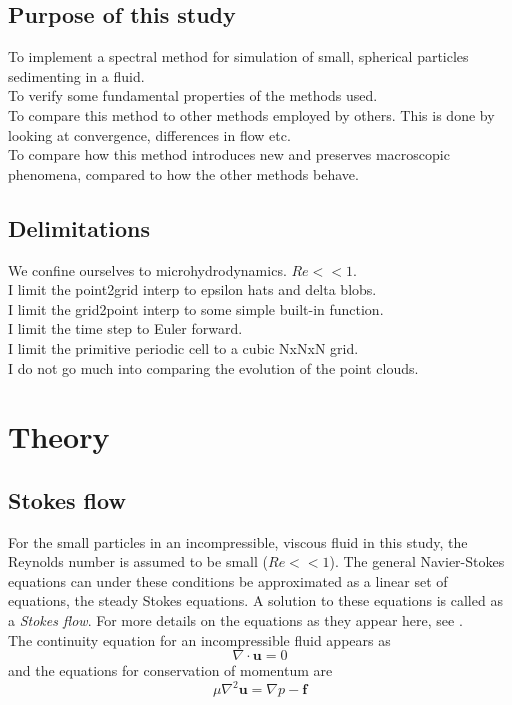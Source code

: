\documentclass[a4paper,twoside=false,abstract=false,numbers=noenddot,
titlepage=false,headings=small,parskip=half,version=last]{scrartcl}
\begin{document}
\subsection{Purpose of this study}
To implement a spectral method for simulation of small, spherical particles sedimenting in a fluid.\\
To verify some fundamental properties of the methods used.\\
To compare this method to other methods employed by others. This is done by looking at convergence, differences in flow etc.\\
To compare how this method introduces new and preserves macroscopic phenomena, compared to how the other methods behave.
\subsection{Delimitations}
We confine ourselves to microhydrodynamics. $Re<<1$.\\
I limit the point2grid interp to epsilon hats and delta blobs.\\
I limit the grid2point interp to some simple built-in function.\\
I limit the time step to Euler forward.\\
I limit the primitive periodic cell to a cubic NxNxN grid.\\
I do not go much into comparing the evolution of the point clouds.\\
\section{Theory}
\subsection{Stokes flow}
For the small particles in an incompressible, viscous fluid in this study, the Reynolds number is assumed to be small ($Re<<1$). The general Navier-Stokes equations can under these conditions be approximated as a linear set of equations, the steady Stokes equations. A solution to these equations is called as a \emph{Stokes flow}. For more details on the equations as they appear here, see \cite{guazzellibook}.\\
The continuity equation for an incompressible fluid appears as
\begin{equation}
\nabla \cdot \mathbf{u} = 0 \label{eq:incompressible}
\end{equation}
and the equations for conservation of momentum are
\begin{equation}
\mu \nabla^2 \mathbf{u} = \nabla p - \mathbf{f} \label{eq:stokesequations}
\end{equation}
\end{document}
